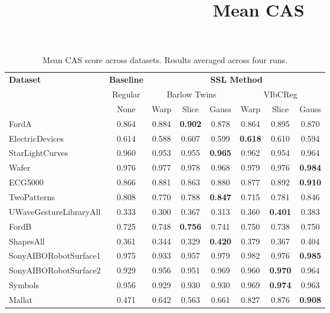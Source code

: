\documentclass[../../thesis.tex]{subfiles}
\begin{document}
\begin{table}[H]
    \centering
    \title{Mean CAS}
    \begin{adjustbox}{width=\textwidth}
    \begin{tabular}{lc|c|c|c|c|c|c} %
        \toprule
        \multirow{3}{*}{\textbf{Dataset}} & \multicolumn{1}{c}{\textbf{Baseline}} & \multicolumn{6}{c}{\textbf{SSL Method}} \\
                                         \cmidrule(lr){3-8}
                                          & \multicolumn{1}{c}{Regular}           & \multicolumn{3}{c}{Barlow Twins}    &  \multicolumn{3}{c}{VIbCReg} \\
                                                                                   \cmidrule(lr){3-5}                    \cmidrule(lr){6-8}
                                          &   None                                & Warp  & Slice & Gauss               & Warp & Slice & Gauss \\
                            
        \midrule
        FordA                   & 0.864 & 0.884 & \textbf{0.902} & 0.878 & 0.864 & 0.895 & 0.870 \\
        ElectricDevices         & 0.614 & 0.588 & 0.607 & 0.599 & \textbf{0.618} & 0.610 & 0.594 \\
        StarLightCurves         & 0.960 & 0.953 & 0.955 & \textbf{0.965} & 0.962 & 0.954 & 0.964 \\
        Wafer                   & 0.976 & 0.977 & 0.978 & 0.968 & 0.979 & 0.976 & \textbf{0.984} \\
        ECG5000                 & 0.866 & 0.881 & 0.863 & 0.880 & 0.877 & 0.892 & \textbf{0.910} \\
        TwoPatterns             & 0.808 & 0.770 & 0.788 & \textbf{0.847} & 0.715 & 0.781 & 0.846 \\
        UWaveGestureLibraryAll  & 0.333 & 0.300 & 0.367 & 0.313 & 0.360 & \textbf{0.401} & 0.383 \\
        FordB                   & 0.725 & 0.748 & \textbf{0.756} & 0.741 & 0.750 & 0.738 & 0.750 \\
        ShapesAll               & 0.361 & 0.344 & 0.329 & \textbf{0.420 }& 0.379 & 0.367 & 0.404 \\
        SonyAIBORobotSurface1   & 0.975 & 0.933 & 0.957 & 0.979 & 0.982 & 0.976 & \textbf{0.985} \\
        SonyAIBORobotSurface2   & 0.929 & 0.956 & 0.951 & 0.969 & 0.960 & \textbf{0.970} & 0.964 \\
        Symbols                 & 0.956 & 0.929 & 0.930 & 0.930 & 0.969 & \textbf{0.974} & 0.963 \\
        Mallat                  & 0.471 & 0.642 & 0.563 & 0.661 & 0.827 & 0.876 & \textbf{0.908} \\
        \bottomrule
    \end{tabular}
    \end{adjustbox}
    \caption{Mean CAS score across datasets. Results averaged across four runs.}
    \label{tab:mean_cas}
\end{table}
\end{document}
